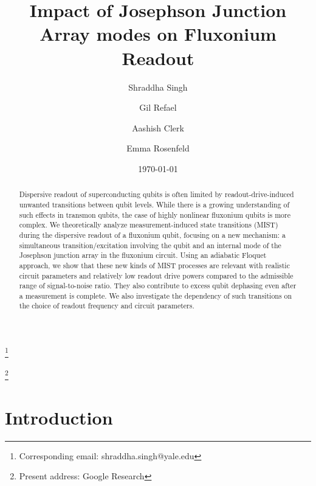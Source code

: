 \documentclass[%
reprint,
superscriptaddress,
 amsmath,amssymb,
 aps,
 prx,
longbibliography,
floatfix,
]{revtex4-2}
\begin{document}
\title{Impact of Josephson Junction Array modes on Fluxonium Readout}

\author{Shraddha Singh}\thanks{Corresponding email: shraddha.singh@yale.edu}
\author{Gil Refael}
\author{Aashish Clerk}
\author{Emma Rosenfeld}\thanks{Present address: Google Research}
\date{\today}%

\begin{abstract}

    Dispersive readout of superconducting qubits is often limited by readout-drive-induced unwanted transitions between qubit levels. While there is a growing understanding of such effects in transmon qubits, the case of highly nonlinear fluxonium qubits is more complex. We theoretically analyze measurement-induced state transitions (MIST) during the dispersive readout of a fluxonium qubit, focusing on a new mechanism: a simultaneous transition/excitation involving the qubit and an internal mode of the Josephson junction array in the fluxonium circuit. Using an adiabatic Floquet approach, we show that these new kinds of MIST processes are relevant with realistic circuit parameters and relatively low readout drive powers compared to the admissible range of signal-to-noise ratio. They also contribute to excess qubit dephasing even after a measurement is complete. We also investigate the dependency of such transitions on the choice of readout frequency and circuit parameters.
\end{abstract}

\maketitle
\section{Introduction}
\end{document}
